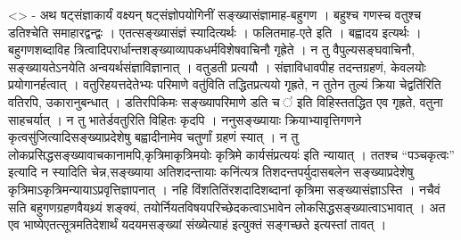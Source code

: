 \textless{}\textgreater{} - अथ षट्संज्ञाकार्यं वक्ष्यन्
षट्संज्ञोपयोगिनीं सङ्ख्यासंज्ञामाह-बहुगण । बहुश्च गणस्च वतुश्च डतिश्चेति
समाहारद्वन्द्वः । एतत्सङ्ख्यासंज्ञं स्यादित्यर्थः । फलितमाह-एते इति ।
बह्वादय इत्यर्थः । बहुगणशब्दाविह
त्रित्वादिपरार्धान्तशङ्ख्याव्यापकधर्मविशेषवाचिनौ गृह्रेते । न तु
वैपुल्यसङ्घवाचिनौ, सङ्ख्यायतेऽनयेति अन्वयर्थसंज्ञाविज्ञानात् । वतुडती
प्रत्ययौ । संज्ञाविधावपीह तदन्तग्रहणं, केवलयोः प्रयोगानर्हत्वात् ।
वतुरिहयत्तदेतेभ्यः परिमाणे वतु॑विति तद्धितप्रत्ययो गृह्रते, न तुतेन
तुल्यं क्रिया चेद्वति॑रिति वतिरपि, उकारानुबन्धात् । डतिरपिकिमः
सङ्ख्यापरिमाणे डति च ॑ इति विहिस्ततद्धित एव गृह्रते, वतुना साहचर्यात् ।
न तु भातेर्डवतुरिति विहितः कृदपि । ननुसङ्ख्यायाः क्रियाभ्यावृत्तिगणने
कृत्वसु॑जित्यादिसङ्ख्याप्रदेशेषु बह्वादीनामेव चतुर्णां ग्रहणं स्यात् । न
तु लोकप्रसिद्धसङ्ख्यावाचकानामपि,कृत्रिमाकृत्रिमयोः कृत्रिमे
कार्यसंप्रत्ययः॑ इति न्यायात् । ततश्च ``पञ्चकृत्वः'' इत्यादि न स्यादिति
चेन्न,सङ्ख्याया अतिशदन्तायाः कनि॑त्यत्र तिशदन्तपर्युदासबलेन
सङ्ख्याप्रदेशेषु कृत्रिमाऽकृत्रिमन्यायाऽप्रवृत्तिज्ञापनात् । नहि
विंशतितिंरशदादिशब्दानां कृत्रिमा सङ्ख्यासंज्ञाऽस्ति । नचैवं सति
बहुगणग्रहणवैयथ्र्यं शङ्क्यं, तयोर्नियतविषयपरिच्छेदकत्वाऽभावेन
लोकसिद्धसङ्ख्यात्वाऽभावात् । अत एव भाष्येएतत्सूत्रमतिदेशार्थं
यदयमसङ्ख्यां संख्येत्याह॑ इत्युक्तं सङ्गच्छते इत्यस्तां तावत् ।
